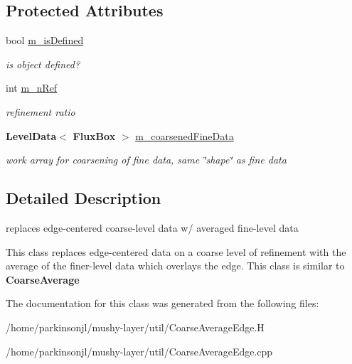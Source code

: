 \subsection*{Protected Attributes}
\begin{DoxyCompactItemize}
\item 
\mbox{\label{class_coarse_average_edge_a4a9be01bec3331bb86caceb272a8e7ea}} 
bool \hyperlink{class_coarse_average_edge_a4a9be01bec3331bb86caceb272a8e7ea}{m\+\_\+is\+Defined}
\begin{DoxyCompactList}\small\item\em is object defined? \end{DoxyCompactList}\item 
\mbox{\label{class_coarse_average_edge_a3a1d2d45d28e7b8c06287c0f5cc5cdd6}} 
int \hyperlink{class_coarse_average_edge_a3a1d2d45d28e7b8c06287c0f5cc5cdd6}{m\+\_\+n\+Ref}
\begin{DoxyCompactList}\small\item\em refinement ratio \end{DoxyCompactList}\item 
\mbox{\label{class_coarse_average_edge_a4a8c9e61ce976a3e28ec52bb8ff78a64}} 
\textbf{ Level\+Data}$<$ \textbf{ Flux\+Box} $>$ \hyperlink{class_coarse_average_edge_a4a8c9e61ce976a3e28ec52bb8ff78a64}{m\+\_\+coarsened\+Fine\+Data}
\begin{DoxyCompactList}\small\item\em work array for coarsening of fine data, same \char`\"{}shape\char`\"{} as fine data \end{DoxyCompactList}\end{DoxyCompactItemize}


\subsection{Detailed Description}
replaces edge-\/centered coarse-\/level data w/ averaged fine-\/level data 

This class replaces edge-\/centered data on a coarse level of refinement with the average of the finer-\/level data which overlays the edge. This class is similar to \textbf{ Coarse\+Average} 

The documentation for this class was generated from the following files\+:\begin{DoxyCompactItemize}
\item 
/home/parkinsonjl/mushy-\/layer/util/Coarse\+Average\+Edge.\+H\item 
/home/parkinsonjl/mushy-\/layer/util/Coarse\+Average\+Edge.\+cpp\end{DoxyCompactItemize}
